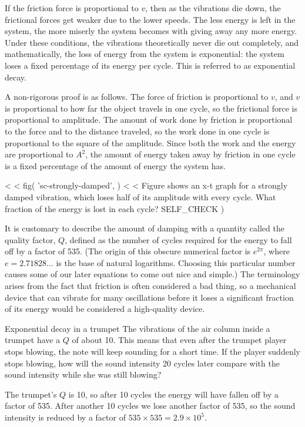 If the friction force is proportional to $v$, then as the
vibrations die down, the frictional forces get weaker due to
the lower speeds. The less energy is left in the system, the
more miserly the system becomes with giving away any more
energy. Under these conditions, the vibrations theoretically
never die out completely, and mathematically, the loss of
energy from the system is exponential: the system loses a
fixed percentage of its energy per cycle. This is referred
to as exponential decay.

A non-rigorous proof is as follows. The force of friction is
proportional to $v$, and $v$ is proportional to how far the
object travels in one cycle, so the frictional force is
proportional to amplitude. The amount of work done by
friction is proportional to the force and to the distance
traveled, so the work done in one cycle is proportional to
the square of the amplitude. Since both the work and the
energy are proportional to $A^2$, the amount of energy taken
away by friction in one cycle is a fixed percentage of the
amount of energy the system has.

<%
<%
  fig(
    'sc-strongly-damped',
  )
<%
<%
Figure  shows an x-t graph for a strongly damped
vibration, which loses half of its amplitude with every
cycle. What fraction of the energy is lost in each cycle?
  SELF_CHECK
  ) %

It is customary to describe the amount of damping with a
quantity called the quality
factor, $Q$, defined as the number of cycles required for
the energy to fall off by a factor of 535. (The origin of
this obscure numerical factor is $e^{2\pi}$, where $e=2.71828\ldots$
is the base of natural logarithms. Choosing this particular number causes
some of our later equations to come out nice and simple.) The terminology arises
from the fact that friction is often considered a bad thing,
so a mechanical device that can vibrate for many oscillations
before it loses a significant fraction of its energy would
be considered a high-quality device.

\begin{eg}{Exponential decay in a trumpet}
\egquestion The vibrations of the air column inside a trumpet
have a $Q$ of about 10. This means that even after the
trumpet player stops blowing, the note will keep sounding
for a short time. If the player suddenly stops blowing, how
will the sound intensity 20 cycles later compare with the
sound intensity while she was still blowing?

\eganswer The trumpet's $Q$ is 10, so after 10 cycles the energy will have
fallen off by a factor of 535. After another 10 cycles we
lose another factor of 535, so the sound intensity is
reduced by a factor of $535 \times 535=2.9\times10^5$.
\end{eg}

